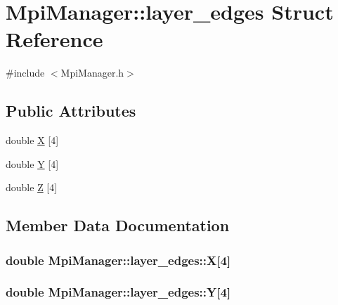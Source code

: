 \hypertarget{struct_mpi_manager_1_1layer__edges}{}\section{Mpi\+Manager\+:\+:layer\+\_\+edges Struct Reference}
\label{struct_mpi_manager_1_1layer__edges}


{\ttfamily \#include $<$Mpi\+Manager.\+h$>$}

\subsection*{Public Attributes}
\begin{DoxyCompactItemize}
\item 
double \hyperlink{struct_mpi_manager_1_1layer__edges_a9f79fa4b504f2d4418f2bc4747cc908c}{X} \mbox{[}4\mbox{]}
\item 
double \hyperlink{struct_mpi_manager_1_1layer__edges_aa4d880e027a6410ff4b34e28dcd1f9d4}{Y} \mbox{[}4\mbox{]}
\item 
double \hyperlink{struct_mpi_manager_1_1layer__edges_a25eea1176a0c06c1e25a7a08b8840283}{Z} \mbox{[}4\mbox{]}
\end{DoxyCompactItemize}


\subsection{Member Data Documentation}
\subsubsection[{\texorpdfstring{X}{X}}]{\setlength{\rightskip}{0pt plus 5cm}double Mpi\+Manager\+::layer\+\_\+edges\+::X\mbox{[}4\mbox{]}}\hypertarget{struct_mpi_manager_1_1layer__edges_a9f79fa4b504f2d4418f2bc4747cc908c}{}\label{struct_mpi_manager_1_1layer__edges_a9f79fa4b504f2d4418f2bc4747cc908c}
\subsubsection[{\texorpdfstring{Y}{Y}}]{\setlength{\rightskip}{0pt plus 5cm}double Mpi\+Manager\+::layer\+\_\+edges\+::Y\mbox{[}4\mbox{]}}\hypertarget{struct_mpi_manager_1_1layer__edges_aa4d880e027a6410ff4b34e28dcd1f9d4}{}\label{struct_mpi_manager_1_1layer__edges_aa4d880e027a6410ff4b34e28dcd1f9d4}
